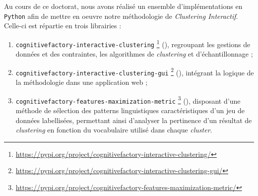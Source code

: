 		Au cours de ce doctorat, nous avons réalisé un ensemble d'implémentations en \texttt{Python} afin de mettre en oeuvre notre méthodologie de \textit{Clustering Interactif}.
		Celle-ci est répartie en trois librairies :
		\begin{enumerate}
			\item \texttt{cognitivefactory-interactive-clustering} \footnote{
				\url{https://pypi.org/project/cognitivefactory-interactive-clustering/}
			} (\cite{schild:2022:cognitivefactory-interactiveclustering}), regroupant les gestions de données et des contraintes, les algorithmes de \textit{clustering} et d'échantillonnage ;
			\item \texttt{cognitivefactory-interactive-clustering-gui} \footnote{
				\url{https://pypi.org/project/cognitivefactory-interactive-clustering-gui/}
			} (\cite{schild-etal:2022:cognitivefactory-interactiveclusteringgui}), intégrant la logique de la méthodologie dans une application web ;
			\item \texttt{cognitivefactory-features-maximization-metric} \footnote{
				\url{https://pypi.org/project/cognitivefactory-features-maximization-metric/}
			} (\cite{schild:2023:cognitivefactory-featuresmaximizationmetric}), disposant d'une méthode de sélection des patterns linguistiques caractéristiques d'un jeu de données labellisées, permettant ainsi d'analyser la pertinence d'un résultat de \textit{clustering} en fonction du vocabulaire utilisé dans chaque \textit{cluster}.
		\end{enumerate}
		
